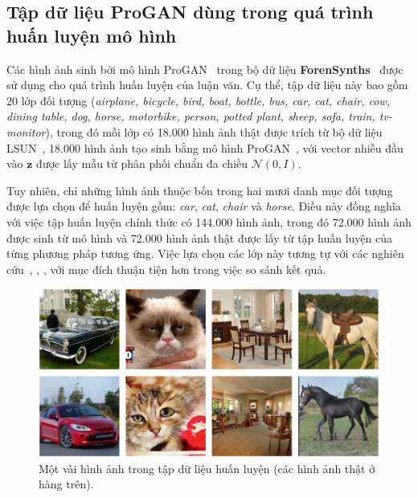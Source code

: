 \subsection{Tập dữ liệu ProGAN dùng trong quá trình huấn luyện mô hình}
Các hình ảnh sinh bởi mô hình ProGAN~\cite{karras2018progressive} trong bộ dữ liệu \textbf{ForenSynths}~\cite{Wang2019CNNGeneratedIA} được sử dụng cho quá trình huấn luyện của luận văn. 
%
Cụ thể, tập dữ liệu này bao gồm 20 lớp đối tượng (\textit{airplane, bicycle, bird, boat, bottle, bus, car, cat, chair, cow, dining table, dog, horse, motorbike, person, potted plant, sheep, sofa, train, tv-monitor}), trong đó mỗi lớp có 18.000 hình ảnh thật được trích từ bộ dữ liệu LSUN~\cite{Yu2015LSUNCO}, 18.000 hình ảnh tạo sinh bằng mô hình ProGAN~\cite{karras2018progressive}, với vector nhiễu đầu vào \( \mathbf{z} \) được lấy mẫu từ phân phối chuẩn đa chiều \( \mathcal{N}(0, I) \).
%
%

Tuy nhiên, chỉ những hình ảnh thuộc bốn trong hai mươi danh mục đối tượng được lựa chọn để huấn luyện gồm: \textit{car}, \textit{cat}, \textit{chair} và \textit{horse}.
%
Điều này đồng nghĩa với việc tập huấn luyện chính thức có 144.000 hình ảnh, trong đó 72.000 hình ảnh được sinh từ mô hình và 72.000 hình ảnh thật được lấy từ tập huấn luyện của từng phương pháp tương ứng.
%
Việc lựa chọn các lớp này tương tự với các nghiên cứu~\cite{Tan2023RethinkingTU}, \cite{Jeong2022FrePGANRD}, \cite{Jeong2021BiHPFBH}, với mục đích thuận tiện hơn trong việc so sánh kết quả.
%
%
\begin{figure}[ht!]
	\centering
	\includegraphics[width=1.0\linewidth]{Images/dataset_progan_samples.png}
	\begin{minipage}{1.0\linewidth}
		\vspace{5mm}
		\caption{Một vài hình ảnh trong tập dữ liệu huấn luyện (các hình ảnh thật ở hàng trên).}
		\label{fig:dataset_progan_samples}
	\end{minipage}
\end{figure}
%

